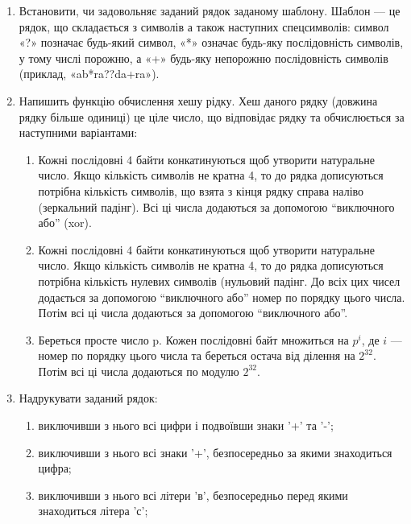 \documentclass[]{article}
\makeatletter
\newcommand{\xslalph}[1]{\expandafter\@xslalph\csname c@#1\endcsname}
\newcommand{\@xslalph}[1]{%
    \ifcase#1\or а\or б\or в\or г\or д\or e\or є\or ж\or з\or i%
    \or й\or к\or л\or м\or н\or о\or п\or р\or с\or т%
    \or у\or ф\or х\or ц\or ч\or ш\or ю\or я\or аа\or бб\or вв %
    \else\@ctrerr\fi%
}
\makeatother
\begin{document}
\begin{enumerate}
\item
  Встановити, чи задовольняє заданий рядок заданому шаблону. Шаблон ---
  це рядок, що складається з символів а також наступних спецсимволів:
  символ «?» позначає будь-який символ, «*» означає будь-яку
  послідовність символів, у тому числі порожню, а «+» будь-яку непорожню
  послідовність символів (приклад, «ab*ra??da+ra»).

\item
 Напишить функцію обчислення хешу рідку. Хеш даного рядку
 (довжина рядку більше одиниці) це ціле число, 
що відповідає рядку та обчислюється за наступними варіантами:

\begin{enumerate}[label=\xslalph*)]
\item Кожні послідовні 4 байти конкатинуються щоб утворити натуральне
число. Якщо кількість символів не кратна 4, то до рядка дописуються
потрібна кількість символів, що взята з кінця рядку справа наліво
(зеркальний падінг). Всі ці числа додаються за допомогою ``виключного
або'' (xor).
\item Кожні послідовні 4 байти конкатинуються щоб утворити натуральне
число. Якщо кількість символів не кратна 4, то до рядка дописуються
потрібна кількість нулевих символів (нульовий падінг. До всіх цих чисел
додається за допомогою ``виключного або'' номер по порядку цього числа.
Потім всі ці числа додаються за допомогою ``виключного або''.
\item Береться просте число p. Кожен послідовні байт множиться на $p^{i}$,
 де $i$ --- номер по порядку цього числа та береться
остача від ділення на $2^{32}$. Потім всі ці числа додаються по модулю $2^{32}$.
\end{enumerate}

\item
Надрукувати заданий рядок:
\begin{enumerate}[label=\xslalph*)]
\item
виключивши з нього всі цифри і подвоївши знаки '+' та '-';

\item виключивши з нього всі знаки '+', безпосередньо за якими знаходиться
цифра;
\item
 виключивши з нього всі літери 'в', безпосередньо перед якими
знаходиться літера 'с';


\end{enumerate}
\end{enumerate}
\end{document}

